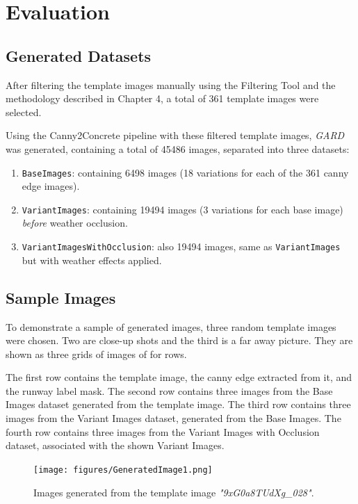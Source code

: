 \chapter{Evaluation}

\section{Generated Datasets}

After filtering the template images manually using the Filtering Tool and
the methodology described in Chapter 4, a total of 361 template images were
selected.

Using the Canny2Concrete pipeline with these filtered template images,
\emph{GARD} was generated, containing a total of 45486 images, separated
into three datasets:

\begin{enumerate}
\item \texttt{BaseImages}: containing 6498 images (18 variations for each of the 361 canny edge images).
\item \texttt{VariantImages}: containing 19494 images (3 variations for each base image) \emph{before} weather occlusion.
\item \texttt{VariantImagesWithOcclusion}: also 19494 images, same as \texttt{VariantImages} but with weather effects applied.
\end{enumerate}

\section{Sample Images}

To demonstrate a sample of generated images, three random template images were
chosen. Two are close-up shots and the third is a far away picture. They
are shown as three grids of images of for rows.

The first row contains the template image, the canny edge extracted from it,
and the runway label mask. The second row contains three images from the Base
Images dataset generated from the template image. The third row contains three
images from the Variant Images dataset, generated from the Base Images. The
fourth row contains three images from the Variant Images with Occlusion dataset,
associated with the shown Variant Images.

\begin{figure}[htbp]
\centering
\texttt{[image: figures/GeneratedImage1.png]}
  \caption{Images generated from the template image \emph{"9xG0a8TUdXg\_028"}.}
\label{fig:noise_to_image}
\end{figure}

